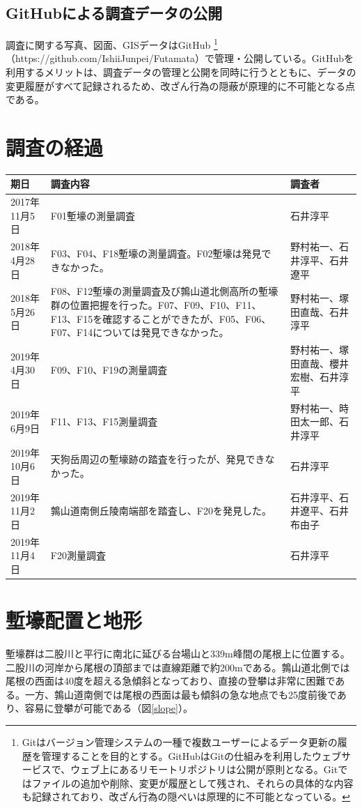 \documentclass[11pt,report]{jsarticle}
\begin{document}
\subsection{GitHubによる調査データの公開}
調査に関する写真、図面、GISデータはGitHub \footnote{
Gitはバージョン管理システムの一種で複数ユーザーによるデータ更新の履歴を管理することを目的とする。GitHubはGitの仕組みを利用したウェブサービスで、ウェブ上にあるリモートリポジトリは公開が原則となる。Gitではファイルの追加や削除、変更が履歴として残され、それらの具体的な内容も記録されており、改ざん行為の隠ぺいは原理的に不可能となっている。
}
（https://github.com/IshiiJunpei/Futamata）で管理・公開している。GitHubを利用するメリットは、調査データの管理と公開を同時に行うとともに、データの変更履歴がすべて記録されるため、改ざん行為の隠蔽が原理的に不可能となる点である。

\section{調査の経過}
\begin{longtable}{l p{} p{}}\hline
期日&調査内容&調査者\\ \hline
2017年11月5日&F01塹壕の測量調査&石井淳平\\
2018年4月28日&F03、F04、F18塹壕の測量調査。F02塹壕は発見できなかった。&野村祐一、石井淳平、石井遼平\\
2018年5月26日&F08、F12塹壕の測量調査及び鶉山道北側高所の塹壕群の位置把握を行った。F07、F09、F10、F11、F13、F15を確認することができたが、F05、F06、F07、F14については発見できなかった。&野村祐一、塚田直哉、石井淳平\\
2019年4月30日&F09、F10、F19の測量調査&野村祐一、塚田直哉、櫻井宏樹、石井淳平\\
2019年6月9日&F11、F13、F15測量調査&野村祐一、時田太一郎、石井淳平\\
2019年10月6日&天狗岳周辺の塹壕跡の踏査を行ったが、発見できなかった。&石井淳平\\
2019年11月2日&鶉山道南側丘陵南端部を踏査し、F20を発見した。&石井淳平、石井遼平、石井布由子\\
2019年11月4日&F20測量調査&石井淳平\\ \hline
\end{longtable}

\section{塹壕配置と地形}
塹壕群は二股川と平行に南北に延びる台場山と339m峰間の尾根上に位置する。二股川の河岸から尾根の頂部までは直線距離で約200mである。鶉山道北側では尾根の西面は40度を超える急傾斜となっており、直接の登攀は非常に困難である。一方、鶉山道南側では尾根の西面は最も傾斜の急な地点でも25度前後であり、容易に登攀が可能である（図\ref{slope}）。
\end{document}
